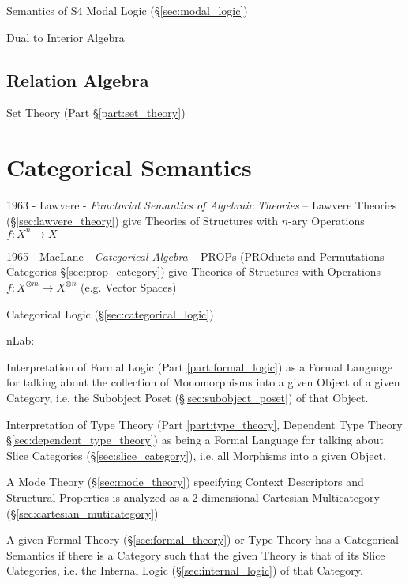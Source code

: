 Semantics of S4 Modal Logic (\S\ref{sec:modal_logic})

Dual to Interior Algebra



\subsection{Relation Algebra}\label{sec:relation_algebra}

Set Theory (Part \S\ref{part:set_theory})



\section{Categorical Semantics}\label{sec:categorical_semantics}

1963 - Lawvere - \emph{Functorial Semantics of Algebraic Theories} -- Lawvere
Theories (\S\ref{sec:lawvere_theory}) give Theories of Structures with $n$-ary
Operations $f : X^n \rightarrow X$

1965 - MacLane - \emph{Categorical Algebra} -- PROPs (PROducts and Permutations
Categories \S\ref{sec:prop_category}) give Theories of Structures with
Operations $f : X^{\otimes m} \rightarrow X^{\otimes n}$ (e.g. Vector Spaces)

\fist Categorical Logic (\S\ref{sec:categorical_logic})

nLab:

Interpretation of Formal Logic (Part \ref{part:formal_logic}) as a
Formal Language for talking about the collection of Monomorphisms into
a given Object of a given Category, i.e. the Subobject Poset
(\S\ref{sec:subobject_poset}) of that Object.

Interpretation of Type Theory (Part \ref{part:type_theory}, Dependent
Type Theory \S\ref{sec:dependent_type_theory}) as being a Formal
Language for talking about Slice Categories
(\S\ref{sec:slice_category}), i.e. all Morphisms into a given Object.

A Mode Theory (\S\ref{sec:mode_theory}) specifying Context Descriptors
and Structural Properties is analyzed as a $2$-dimensional Cartesian
Multicategory (\S\ref{sec:cartesian_muticategory})

A given Formal Theory (\S\ref{sec:formal_theory}) or Type Theory has a
Categorical Semantics if there is a Category such that the given
Theory is that of its Slice Categories, i.e. the Internal Logic
(\S\ref{sec:internal_logic}) of that Category.



